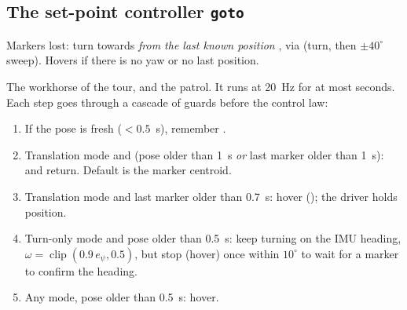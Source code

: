 \subsection{The set-point controller \texorpdfstring{\texttt{goto}}{goto}}

Markers lost: turn towards  \emph{from the last known position} , via
 (turn, then $\pm 40^\circ$ sweep). Hovers if there is no yaw or no last position.

The workhorse of the tour,  and the patrol. It runs  at 20~Hz for at most
 seconds. Each step goes through a cascade of guards before the control law:

\begin{enumerate}[nosep]
  \item If the pose is fresh ($<0.5$~s), remember .
  \item Translation mode and (pose older than 1~s \emph{or} last marker older than 1~s):  and
        return. Default  is the marker centroid.
  \item Translation mode and last marker older than 0.7~s: hover (); the driver holds position.
  \item Turn-only mode and pose older than 0.5~s: keep turning on the IMU heading,
        $\omega = \operatorname{clip}(0.9\,e_\psi, 0.5)$, but stop (hover) once within $10^\circ$ to wait for a
        marker to confirm the heading.
  \item Any mode, pose older than 0.5~s: hover.
\end{enumerate}

